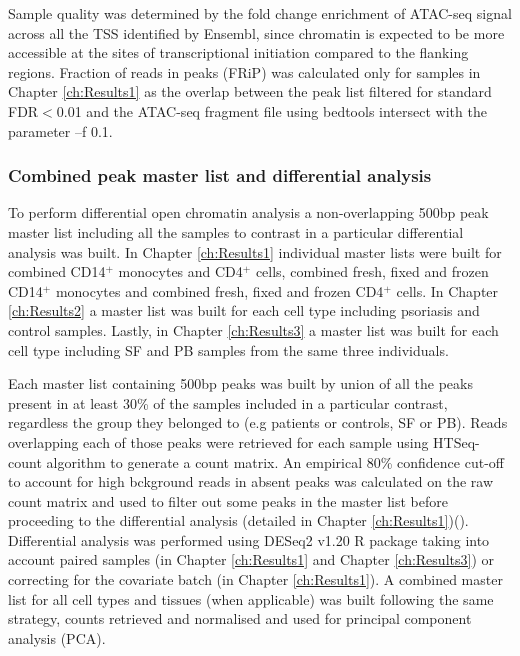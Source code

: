 Sample quality was determined by the fold change enrichment of ATAC-seq signal across all the TSS identified by Ensembl, since chromatin is expected to be more accessible at the sites of transcriptional initiation compared to the flanking regions. Fraction of reads in peaks (FRiP) was calculated only for samples in Chapter \ref{ch:Results1} as the overlap between the peak list filtered for standard FDR$<$0.01 and the ATAC-seq fragment file using bedtools intersect with the parameter --f 0.1.

\subsubsection{Combined peak master list and differential analysis}
To perform differential open chromatin analysis a non-overlapping 500bp peak master list including all the samples to contrast in a particular differential analysis was built. In Chapter \ref{ch:Results1} individual master lists were built for combined CD14$^+$ monocytes and CD4$^+$ cells, combined fresh, fixed and frozen CD14$^+$ monocytes and combined fresh, fixed and frozen CD4$^+$ cells. In Chapter \ref{ch:Results2} a master list was built for each cell type including psoriasis and control samples. Lastly, in Chapter \ref{ch:Results3} a master list was built for each cell type including SF and PB samples from the same three individuals. 

Each master list containing 500bp peaks was built by union of all the peaks present in at least 30\% of the samples included in a particular contrast, regardless the group they belonged to (e.g patients or controls, SF or PB). Reads overlapping each of those peaks were retrieved for each sample using HTSeq-count algorithm \parencite{} to generate a count matrix. An empirical 80\% confidence cut-off to account for high bckground reads in absent peaks was calculated on the raw count matrix and used to filter out some peaks in the master list before proceeding to the differential analysis (detailed in Chapter \ref{ch:Results1})(\parencite{Xinmin2005,Jonker2014}). Differential analysis was performed using DESeq2 v1.20 R package \parencite{Love2014} taking into account paired samples (in Chapter \ref{ch:Results1} and Chapter \ref{ch:Results3}) or correcting for the covariate batch (in Chapter \ref{ch:Results1}).
A combined master list for all cell types and tissues (when applicable) was built following the same strategy, counts retrieved and normalised and used for principal component analysis (PCA). 



